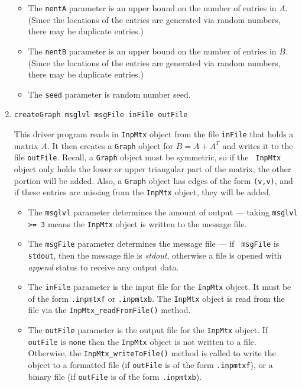 \begin{enumerate}
\begin{itemize}
\item
The {\tt nentA} parameter is an upper bound on the number of entries
in $A$. (Since the locations of the entries are generated via
random numbers, there may be duplicate entries.) 
\item
The {\tt nentB} parameter is an upper bound on the number of entries
in $B$. (Since the locations of the entries are generated via
random numbers, there may be duplicate entries.) 
\item
The {\tt seed} parameter is random number seed.
\end{itemize}
\item
\begin{verbatim}
createGraph msglvl msgFile inFile outFile
\end{verbatim}
This driver program reads in {\tt InpMtx} object from the file
{\tt inFile} that holds a matrix $A$.
It then creates a {\tt Graph} object for $B = A + A^T$
and writes it to the file {\tt outFile}.
Recall, a {\tt Graph} object must be symmetric, so if the {\tt
InpMtx} object only holds the lower or upper triangular part 
of the matrix, the other portion will be added.
Also, a {\tt Graph} object has edges of the form {\tt (v,v)},
and if these entries are missing from the {\tt InpMtx} object,
they will be added.
\par
\begin{itemize}
\item
The {\tt msglvl} parameter determines the amount of output ---
taking {\tt msglvl >= 3} means the {\tt InpMtx} object is written
to the message file.
\item
The {\tt msgFile} parameter determines the message file --- if {\tt
msgFile} is {\tt stdout}, then the message file is {\it stdout},
otherwise a file is opened with {\it append} status to receive any
output data.
\item
The {\tt inFile} parameter is the input file for the {\tt InpMtx}
object. It must be of the form {\tt *.inpmtxf} or {\tt *.inpmtxb}.
The {\tt InpMtx} object is read from the file via the
{\tt InpMtx\_readFromFile()} method.
\item
The {\tt outFile} parameter is the output file for the {\tt InpMtx}
object. 
If {\tt outFile} is {\tt none} then the {\tt InpMtx} object is not
written to a file. 
Otherwise, the {\tt InpMtx\_writeToFile()} method is called to write
the object to 
a formatted file (if {\tt outFile} is of the form {\tt *.inpmtxf}),
or
a binary file (if {\tt outFile} is of the form {\tt *.inpmtxb}).

\end{itemize}
\end{enumerate}
